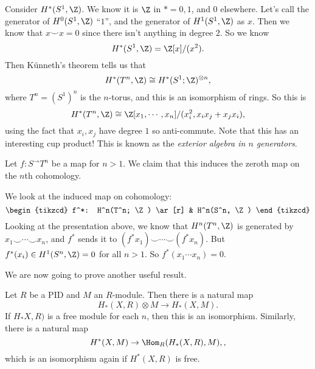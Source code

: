 \documentclass[a4paper]{article}
\begin{document}
\begin{eg}
  Consider $H^*(S^1, \Z)$. We know it is $\Z$ in $* = 0, 1$, and $0$ elsewhere. Let's call the generator of $H^0(S^1, \Z)$ ``$1$'', and the generator of $H^1(S^1, \Z)$ as $x$. Then we know that $x \smile x = 0$ since there isn't anything in degree $2$. So we know
  \[
    H^*(S^1, \Z) = \Z[x]/(x^2).
  \]
  Then K\"unneth's theorem tells us that
  \[
    H^*(T^n, \Z) \cong H^*(S^1; \Z)^{\otimes n},
  \]
  where $T^n = (S^1)^n$ is the $n$-torus, and this is an isomorphism of rings. So this is
  \[
    H^*(T^n, \Z) \cong \Z[x_1, \cdots, x_n]/(x_i^2, x_i x_j + x_j x_i),
  \]
  using the fact that $x_i, x_j$ have degree $1$ so anti-commute. Note that this has an interesting cup product! This is known as the \emph{exterior algebra in $n$ generators}.
\end{eg}

\begin{eg}
  Let $f: S^ \to T^n$ be a map for $n > 1$. We claim that this induces the zeroth map on the $n$th cohomology.

  We look at the induced map on cohomology:
  \[
    \begin{tikzcd}
      f^*: H^n(T^n; \Z) \ar[r] & H^n(S^n, \Z)
    \end{tikzcd}
  \]
  Looking at the presentation above, we know that $H^n(T^n, \Z)$ is generated by $x_1 \smile \cdots \smile x_n$, and $f^*$ sends it to $(f^* x_1) \smile \cdots \smile (f^* x_n)$. But $f^*(x_i) \in H^1(S^n, \Z) = 0$ for all $n > 1$. So $f^* (x_1 \cdots x_n) = 0$.
\end{eg}

We are now going to prove another useful result.
\begin{thm}
  Let $R$ be a PID and $M$ an $R$-module. Then there is a natural map
  \[
    H_*(X, R)\otimes M \to H_*(X, M).
  \]
  If $H_*X, R)$ is a free module for each $n$, then this is an isomorphism. Similarly, there is a natural map
  \[
    H^*(X, M) \to \Hom_R(H_*(X, R), M),,
  \]
  which is an isomorphism again if $H^*(X, R)$ is free.
\end{thm}
\end{document}
